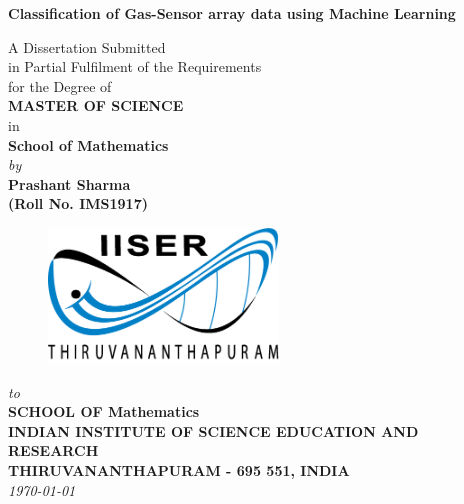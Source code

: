 \begin{titlepage}
\enlargethispage{3cm}

\begin{center}

\vspace*{-1cm}

\textbf{\Large Classification of Gas-Sensor array data using Machine Learning}\\[10pt]

\vspace*{0.5cm}


A Dissertation Submitted \\
in Partial Fulfilment of the Requirements  \\
for the Degree of  \\
\vspace{5mm}
{\Large \bf MASTER OF SCIENCE } \\
in \\
{\large \bf School of Mathematics } \\

\vspace{10mm}
{\em  by} \\ \vspace{3mm}
{\large \bf Prashant Sharma} \\
{\large \bf (Roll No. IMS1917)}\\[.3in]

\vfill

\begin{figure}[h]
  \begin{center}
  \includegraphics[height=36mm]{Images/Logos/iiser_logo.png}
  \end{center}
\end{figure}
\vspace*{0.2cm}

{\em\large to }\\%
{\bf\large SCHOOL OF Mathematics} \\%
{\bf\large INDIAN INSTITUTE OF SCIENCE EDUCATION AND RESEARCH}\\%
{\bf\large THIRUVANANTHAPURAM - 695 551, INDIA}\\%
{\it\large \today}

\end{center}

\end{titlepage}

\clearpage

